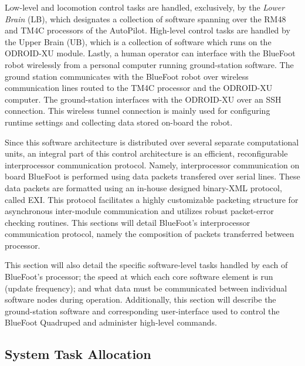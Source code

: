 	Low-level and locomotion control tasks are handled, exclusively, by the \emph{Lower Brain} (LB), which designates a collection of software spanning over the RM48 and TM4C processors of the AutoPilot. High-level control tasks are handled by the Upper Brain (UB), which is a collection of software which runs on the ODROID-XU module. Lastly, a human operator can interface with the BlueFoot robot wirelessly from a personal computer running ground-station software. The ground station communicates with the BlueFoot robot over wireless communication lines routed to the TM4C processor and the ODROID-XU computer. The ground-station interfaces with the ODROID-XU over an SSH connection. This wireless tunnel connection is mainly used for configuring runtime settings and collecting data stored on-board the robot.

	Since this software architecture is distributed over several separate computational units, an integral part of this control architecture is an efficient, reconfigurable interprocessor communication protocol. Namely, interprocessor communication on board BlueFoot is performed using data packets transfered over serial lines. These data packets are formatted using an in-house designed binary-XML protocol, called EXI. This protocol facilitates a highly customizable packeting structure for asynchronous inter-module communication and utilizes robust packet-error checking routines. This sections will detail BlueFoot's interprocessor communication protocol, namely the composition of packets transferred between processor. 

	This section will also detail the specific software-level tasks handled by each of BlueFoot's processor; the speed at which each core software element is run (update frequency); and what data must be communicated between individual software nodes during operation. Additionally, this section will describe the ground-station software and corresponding user-interface used to control the BlueFoot Quadruped and administer high-level commands.
	
	\subsection{System Task Allocation}

